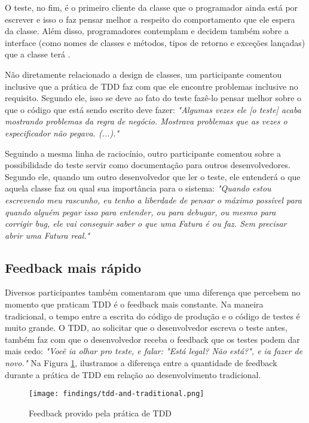 O teste, no fim, é o primeiro cliente da classe que o programador ainda está por escrever e 
isso o faz pensar melhor a respeito do comportamento que ele espera da classe. Além disso,
programadores contemplam e decidem também sobre a interface (como nomes de
classes e métodos, tipos de retorno e exceções lançadas) que a classe terá
\cite{janzen-saiedian}.

Não diretamente relacionado a design de classes, um participante comentou inclusive
que a prática de TDD faz com que ele encontre problemas inclusive no requisito. Segundo ele,
isso se deve ao fato do teste fazê-lo pensar melhor sobre o que o código que está 
sendo escrito deve fazer:
\textit{"Algumas vezes ele [o teste] acaba mostrando problemas da regra de negócio. Mostrava problemas
que as vezes o especificador não pegava. (...)."}

Seguindo a mesma linha de raciocínio, outro participante comentou sobre a possibilidade
do teste servir como documentação para outros desenvolvedores. Segundo ele, quando um outro desenvolvedor
que ler o teste, ele entenderá o que aquela classe faz ou qual sua importância para o sistema:
\textit{"Quando estou escrevendo meu rascunho, eu tenho a liberdade de pensar o máximo possível para quando alguém
pegar isso para entender, ou para debugar, ou mesmo para corrigir bug, ele vai conseguir saber o que uma Fatura é ou faz. Sem
precisar abrir uma Fatura real."}

\subsection{Feedback mais rápido}

Diversos participantes também comentaram que uma diferença que percebem
no momento que praticam TDD é o feedback mais constante. Na maneira
tradicional, o tempo entre a escrita do código de produção e o código
de testes é muito grande. O TDD, ao solicitar que o desenvolvedor
escreva o teste antes, também faz com que o desenvolvedor receba o feedback que
os testes podem dar mais cedo:
\textit{"Você ia olhar pro teste, e falar: "Está legal? Não está?", e ia fazer de novo."}
Na Figura \ref{fig:tdd-feedback}, ilustramos
a diferença entre a quantidade de feedback durante a prática de TDD em relação
ao desenvolvimento tradicional.

\begin{figure}[h!H]
  \centering
  \texttt{[image: findings/tdd-and-traditional.png]}
  \caption{Feedback provido pela prática de TDD}
  \label{fig:tdd-feedback}
\end{figure}


